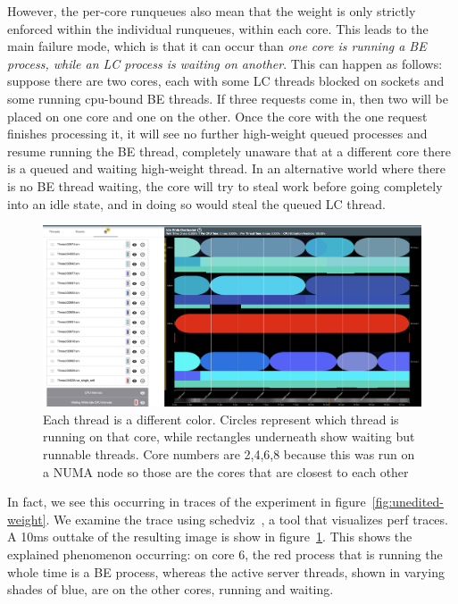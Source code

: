 However, the per-core runqueues also mean that the weight is only strictly
enforced within the individual runqueues, \ie{} within each core. This leads to
the main failure mode, which is that it can occur than \textit{one core is
running a BE process, while an LC process is waiting on another}. This can
happen as follows: suppose there are two cores, each with some LC threads
blocked on sockets and some running cpu-bound BE threads. If three requests come
in, then two will be placed on one core and one on the other. Once the core with
the one request finishes processing it, it will see no further high-weight
queued processes and resume running the BE thread, completely unaware that at a
different core there is a queued and waiting high-weight thread. In an
alternative world where there is no BE thread waiting, the core will try to
steal work before going completely into an idle state, and in doing so would
steal the queued LC thread.

\begin{figure}[t]
    \centering
    \includegraphics[width=\textwidth]{graphs/schedviz.png}
        \caption{Each thread is a different color. Circles represent which
    thread is running on that core, while rectangles underneath show waiting but
    runnable threads. Core numbers are 2,4,6,8 because this was run on a NUMA
    node so those are the cores that are closest to each other
    }\label{fig:schedviz}
\end{figure}

In fact, we see this occurring in traces of the experiment in
figure~\ref{fig:unedited-weight}. We examine the trace using
schedviz~\cite{schedviz}, a tool that visualizes perf traces. A 10ms outtake of
the resulting image is show in figure~\ref{fig:schedviz}. This shows the
explained phenomenon occurring: on core 6, the red process that is running the
whole time is a BE process, whereas the active server threads, shown in varying
shades of blue, are on the other cores, running and waiting.


